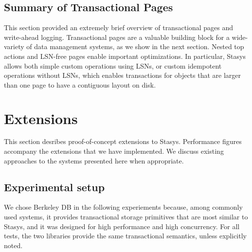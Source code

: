 \documentclass[letterpaper,twocolumn,10pt]{article}
\newcommand{\yad}{Stasys\xspace}
\newcommand{\eat}[1]{}
\begin{document}
\subsection{Summary of Transactional Pages}

This section provided an extremely brief overview of transactional
pages and write-ahead logging.  Transactional pages are a valuable
building block for a wide-variety of data management systems, as we
show in the next section.  Nested top actions and LSN-free pages
enable important optimizations.  In particular, \yad allows both
simple custom operations using LSNs, or custom idempotent operations
without LSNs, which enables transactions for objects that are larger than
one page to have a contiguous layout on disk.

\eat{
Although the extensions that it proposes
require a fair amount of knowledge about transactional logging
schemes, our initial experience customizing the system for various
applications is positive.  We believe that the time spent customizing
the library is less than amount of time that it would take to work
around typical problems with existing transactional storage systems.

}



\section{Extensions}

This section desribes proof-of-concept extensions to \yad.
Performance figures accompany the extensions that we have implemented.
We discuss existing approaches to the systems presented here when
appropriate.

\subsection{Experimental setup}

\label{sec:experimental_setup}

We chose Berkeley DB in the following experiements because, among
commonly used systems, it provides transactional storage primitives
that are most similar to \yad, and it was designed for high
performance and high concurrency.  For all tests, the two libraries
provide the same transactional semantics, unless explicitly noted.
\end{document}
